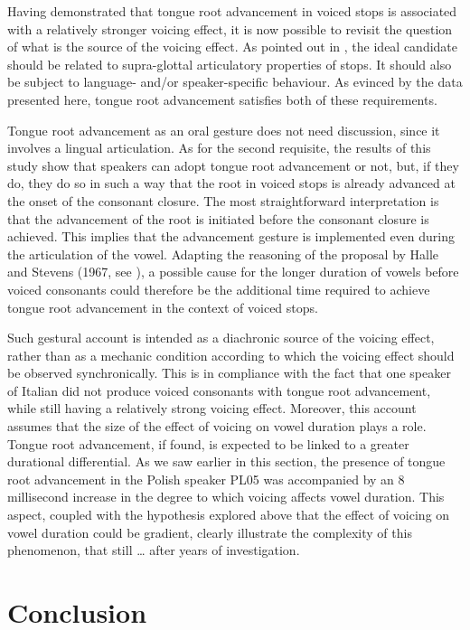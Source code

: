 \documentclass[authoryear, twocolumn]{elsarticle}
\begin{document}
Having demonstrated that tongue root advancement in voiced stops is
associated with a relatively stronger voicing effect, it is now possible
to revisit the question of what is the source of the voicing effect. As
pointed out in , the ideal candidate should be related to
supra-glottal articulatory properties of stops. It should also be
subject to language- and/or speaker-specific behaviour. As evinced by
the data presented here, tongue root advancement satisfies both of these
requirements.

Tongue root advancement as an oral gesture does not need discussion,
since it involves a lingual articulation. As for the second requisite,
the results of this study show that speakers can adopt tongue root
advancement or not, but, if they do, they do so in such a way that the
root in voiced stops is already advanced at the onset of the consonant
closure. The most straightforward interpretation is that the advancement
of the root is initiated before the consonant closure is achieved. This
implies that the advancement gesture is implemented even during the
articulation of the vowel. Adapting the reasoning of the proposal by
Halle and Stevens (1967, see ), a possible cause for the
longer duration of vowels before voiced consonants could therefore be
the additional time required to achieve tongue root advancement in the
context of voiced stops.

Such gestural account is intended as a diachronic source of the voicing
effect, rather than as a mechanic condition according to which the
voicing effect should be observed synchronically. This is in compliance
with the fact that one speaker of Italian did not produce voiced
consonants with tongue root advancement, while still having a relatively
strong voicing effect. Moreover, this account assumes that the size of
the effect of voicing on vowel duration plays a role. Tongue root
advancement, if found, is expected to be linked to a greater durational
differential. As we saw earlier in this section, the presence of tongue
root advancement in the Polish speaker PL05 was accompanied by an 8
millisecond increase in the degree to which voicing affects vowel
duration. This aspect, coupled with the hypothesis explored above that
the effect of voicing on vowel duration could be gradient, clearly
illustrate the complexity of this phenomenon, that still \ldots{} after
years of investigation.

\section{Conclusion}\label{conclusion}

\label{s:conclusion}


\end{document}
